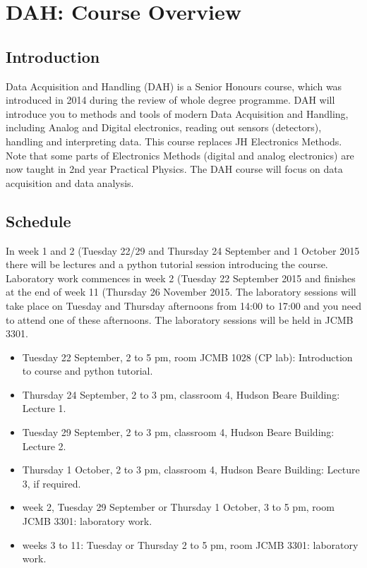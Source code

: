 \chapter{DAH: Course Overview}
\label{sec:overview}

\section{Introduction}

Data Acquisition and Handling (DAH) is a  Senior Honours course, which was introduced in 2014 during the review of whole degree programme. DAH will introduce you to methods and tools of modern Data Acquisition and Handling, including Analog and Digital electronics, reading out sensors (detectors), handling and interpreting data. This course replaces JH Electronics Methods. Note that some parts of Electronics Methods (digital and analog electronics) are now taught in 2nd year Practical Physics. The DAH course will focus on data acquisition and data analysis.


\section{Schedule}
In week 1  and 2 (Tuesday 22/29 and Thursday 24 September and 1 October 2015 there will be lectures and a python tutorial session introducing the course.
 Laboratory work commences in week 2 (Tuesday 22 September 2015 and finishes at the end of week 11 (Thursday 26 November 2015. The laboratory sessions will take place on Tuesday and Thursday afternoons from 14:00 to 17:00 and you need to attend one of these afternoons. The laboratory sessions will be held in JCMB 3301.
\begin{itemize}
\item Tuesday 22 September, 2 to 5 pm, room JCMB 1028 (CP lab): Introduction to course and python tutorial.
\item Thursday 24 September, 2 to 3 pm,  classroom 4, Hudson Beare Building: Lecture 1.
\item Tuesday 29 September,  2 to 3 pm, classroom 4, Hudson Beare Building: Lecture 2.
\item Thursday 1 October,  2 to 3 pm, classroom 4, Hudson Beare Building: Lecture 3, if required.
\item week 2, Tuesday 29 September or Thursday  1 October, 3 to 5 pm, room JCMB 3301: laboratory work.
\item weeks 3 to 11:  Tuesday or Thursday 2 to 5 pm, room JCMB 3301: laboratory work.
\end{itemize}



